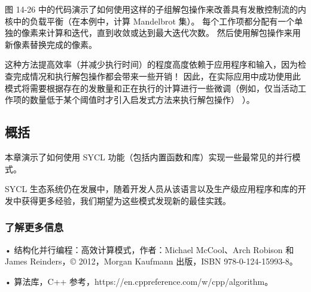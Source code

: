 图 14-26 中的代码演示了如何使用这样的子组解包操作来改善具有发散控制流的内核中的负载平衡（在本例中，计算 Mandelbrot 集）。 每个工作项都分配有一个单独的像素来计算和迭代，直到收敛或达到最大迭代次数。 然后使用解包操作来用新像素替换完成的像素。

这种方法提高效率（并减少执行时间）的程度高度依赖于应用程序和输入，因为检查完成情况和执行解包操作都会带来一些开销！ 因此，在实际应用中成功使用此模式将需要根据存在的发散量和正在执行的计算进行一些微调（例如，仅当活动工作项的数量低于某个阈值时才引入启发式方法来执行解包操作） ）。

\subsection{概括}
本章演示了如何使用 SYCL 功能（包括内置函数和库）实现一些最常见的并行模式。

SYCL 生态系统仍在发展中，随着开发人员从该语言以及生产级应用程序和库的开发中获得更多经验，我们期望为这些模式发现新的最佳实践。

\subsubsection{了解更多信息}
• 结构化并行编程：高效计算模式，作者：Michael McCool、Arch Robison 和 James Reinders，© 2012，Morgan Kaufmann 出版，ISBN 978-0-124-15993-8。

• 算法库，C++ 参考，https://en.cppreference.com/w/cpp/algorithm。